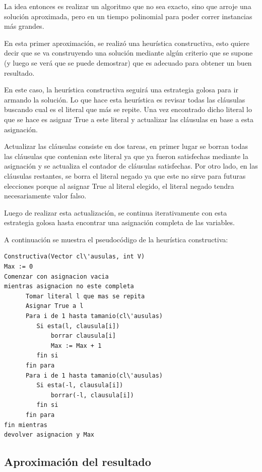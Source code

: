 \documentclass[a4paper,10pt]{article}
\begin{document}
La idea entonces es realizar un algoritmo que no sea exacto, sino que arroje una soluci\'on aproximada, pero en un tiempo polinomial para poder correr instancias m\'as grandes.

En esta primer aproximaci\'on, se realiz\'o una heur\'istica constructiva, esto quiere decir que se va construyendo una soluci\'on mediante alg\'un criterio que se supone (y luego se ver\'a que se puede demostrar) que es adecuado para obtener un buen resultado.

En este caso, la heur\'istica constructiva seguir\'a una estrategia golosa para ir armando la soluci\'on. Lo que hace esta heur\'istica es revisar todas las cl\'ausulas buscando cual es el literal que m\'as se repite. Una vez encontrado dicho literal lo que se hace es asignar True a este literal y actualizar las cl\'ausulas en base a esta asignaci\'on.

Actualizar las cl\'ausulas consiste en dos tareas, en primer lugar se borran todas las cl\'ausulas que contenian este literal ya que ya fueron satisfechas mediante la asignaci\'on y se actualiza el contador de cl\'ausulas satisfechas. Por otro lado, en las cl\'ausulas restantes, se borra el literal negado ya que este no sirve para futuras elecciones porque al asignar True al literal elegido, el literal negado tendra necesariamente valor falso.

Luego de realizar esta actualizaci\'on, se continua iterativamente con esta estrategia golosa hasta encontrar una asignaci\'on completa de las variables.

A continuaci\'on se muestra el pseudoc\'odigo de la heur\'istica constructiva:

\begin{verbatim}
Constructiva(Vector cl\'ausulas, int V)
Max := 0
Comenzar con asignacion vacia
mientras asignacion no este completa
      Tomar literal l que mas se repita
      Asignar True a l
      Para i de 1 hasta tamanio(cl\'ausulas)
         Si esta(l, clausula[i])
             borrar clausula[i]
             Max := Max + 1
         fin si
      fin para
      Para i de 1 hasta tamanio(cl\'ausulas)
         Si esta(-l, clausula[i])
             borrar(-l, clausula[i])
         fin si
      fin para
fin mientras
devolver asignacion y Max
\end{verbatim}

\subsection*{Aproximaci\'on del resultado}
\end{document}
